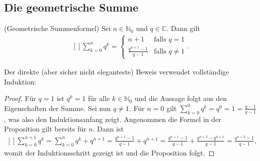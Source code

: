 \documentclass[../Analysis1_script.tex]{subfiles}
\begin{document}
\subsection{Die geometrische Summe}
\begin{proposition}{(Geometrische Summenformel)}
	Sei $n \in \mathbb {N}_0$ und $q \in \mathbb {C}$. Dann gilt
	\[\begin{aligned}[]
		\sum _{k=0}^n q^k = \left \lbrace 
		\begin{array}{cc} 
			n+1 & \text {falls } q=1 \\ 
			\frac {q^{n+1}-1}{q-1} & \text {falls } q \neq 1
		\end{array} \right . .
	\end{aligned}\] 
\end{proposition}
Der direkte (aber sicher nicht eleganteste) Beweis verwendet vollständige Induktion:
\begin{proof}
	Für $q=1$ ist $q^k=1$ für alle $k\in \mathbb {N}_0$ und die Aussage folgt aus den Eigenschaften der Summe. Sei nun $q\neq 1$. Für $n=0$ gilt $\sum _{k=0}^0 q^k = q^0 = 1 = \frac {q-1}{q-1}$, was also den Induktionsanfang zeigt. Angenommen die Formel in der Proposition gilt bereits für $n$. Dann ist
	\[\begin{aligned}[]
		\sum _{k=0}^{n+1} q^k = \sum _{k=0}^n q^k + q^{n+1} = \frac {q^{n+1}-1}{q-1} + q^{n+1} = \frac {q^{n+1}-1}{q-1} + \frac {q^{n+2}-q^{n+1}}{q-1} = \frac {q^{n+2}-1}{q-1},
	\end{aligned}\]
	womit der Induktionsschritt gezeigt ist und die Proposition folgt.   
\end{proof}
\end{document}
